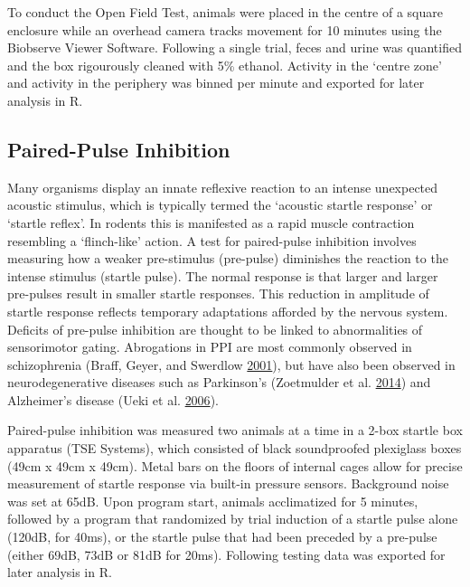 \documentclass[onehalf,12pt]{beavtex}
\begin{document}
  To conduct the Open Field Test, animals were placed in the centre of a
  square enclosure while an overhead camera tracks movement for 10 minutes
  using the Biobserve Viewer Software. Following a single trial, feces and
  urine was quantified and the box rigourously cleaned with 5\% ethanol.
  Activity in the `centre zone' and activity in the periphery was binned
  per minute and exported for later analysis in R.
  
  \subsection{Paired-Pulse Inhibition}\label{paired-pulse-inhibition-1}
  
  Many organisms display an innate reflexive reaction to an intense
  unexpected acoustic stimulus, which is typically termed the `acoustic
  startle response' or `startle reflex'. In rodents this is manifested as
  a rapid muscle contraction resembling a `flinch-like' action. A test for
  paired-pulse inhibition involves measuring how a weaker pre-stimulus
  (pre-pulse) diminishes the reaction to the intense stimulus (startle
  pulse). The normal response is that larger and larger pre-pulses result
  in smaller startle responses. This reduction in amplitude of startle
  response reflects temporary adaptations afforded by the nervous system.
  Deficits of pre-pulse inhibition are thought to be linked to
  abnormalities of sensorimotor gating. Abrogations in PPI are most
  commonly observed in schizophrenia (Braff, Geyer, and Swerdlow
  \protect\hyperlink{ref-BraffHumanstudiesprepulse2001}{2001}), but have
  also been observed in neurodegenerative diseases such as Parkinson's
  (Zoetmulder et al.
  \protect\hyperlink{ref-ZoetmulderPrepulseInhibitionAssociated2014}{2014})
  and Alzheimer's disease (Ueki et al.
  \protect\hyperlink{ref-UekiPrepulseinhibitionacoustic2006}{2006}).
  
  Paired-pulse inhibition was measured two animals at a time in a 2-box
  startle box apparatus (TSE Systems), which consisted of black
  soundproofed plexiglass boxes (49cm x 49cm x 49cm). Metal bars on the
  floors of internal cages allow for precise measurement of startle
  response via built-in pressure sensors. Background noise was set at
  65dB. Upon program start, animals acclimatized for 5 minutes, followed
  by a program that randomized by trial induction of a startle pulse alone
  (120dB, for 40ms), or the startle pulse that had been preceded by a
  pre-pulse (either 69dB, 73dB or 81dB for 20ms). Following testing data
  was exported for later analysis in R.
  
\end{document}
